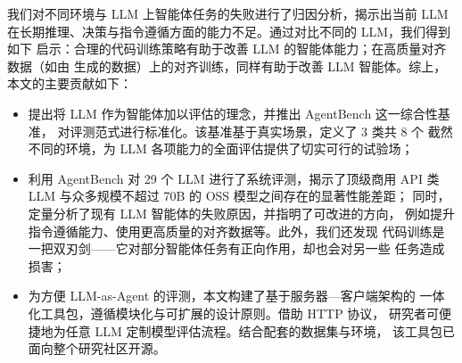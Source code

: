我们对不同环境与 LLM 上智能体任务的失败进行了归因分析，揭示出当前 LLM
在长期推理、决策与指令遵循方面的能力不足。通过对比不同的 LLM，我们得到如下
启示：合理的代码训练策略有助于改善 LLM 的智能体能力；在高质量对齐数据（如由
 生成的数据）上的对齐训练，同样有助于改善 LLM 智能体。综上，
本文的主要贡献如下：
\begin{itemize}
    \item 提出将 LLM 作为智能体加以评估的理念，并推出 AgentBench 这一综合性基准，
          对评测范式进行标准化。该基准基于真实场景，定义了 3 类共 8 个
          截然不同的环境，为 LLM 各项能力的全面评估提供了切实可行的试验场；
    \item 利用 AgentBench 对 29 个 LLM 进行了系统评测，揭示了顶级商用 API 类
          LLM 与众多规模不超过 70B 的 OSS 模型之间存在的显著性能差距；
          同时，定量分析了现有 LLM 智能体的失败原因，并指明了可改进的方向，
          例如提升指令遵循能力、使用更高质量的对齐数据等。此外，我们还发现
          代码训练是一把双刃剑——它对部分智能体任务有正向作用，却也会对另一些
          任务造成损害；
    \item 为方便 LLM-as-Agent 的评测，本文构建了基于服务器—客户端架构的
          一体化工具包，遵循模块化与可扩展的设计原则。借助 HTTP 协议，
          研究者可便捷地为任意 LLM 定制模型评估流程。结合配套的数据集与环境，
          该工具包已面向整个研究社区开源。
\end{itemize}
